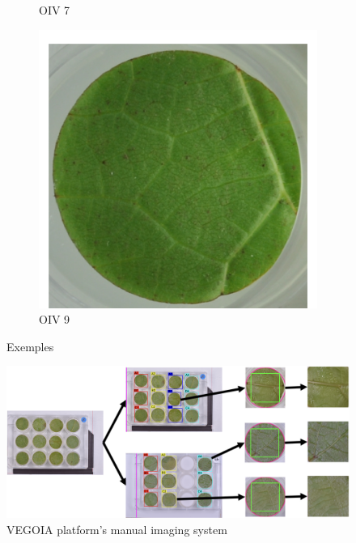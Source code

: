\documentclass[english]{article}
\begin{document}
\begin{figure}[H]
\begin{subfigure}[b]{0.3\linewidth}
        \caption{OIV 7}\label{fig:oiv7}
    \end{subfigure}
    \begin{subfigure}[b]{0.3\linewidth}
        \includegraphics[width=\linewidth]{oiv9.png}
        \caption{OIV 9}\label{fig:oiv9}
    \end{subfigure}
    \caption{Exemples }\label{fig:phenotypes}
\end{figure}

\begin{figure}[H]
    \begin{center}
        \includegraphics[width=0.9\linewidth]{2023_a_oiv_indexation}
        \caption{VEGOIA platform's manual imaging system}\label{fig:preprocessing}
    \end{center}
\end{figure}
\end{document}
